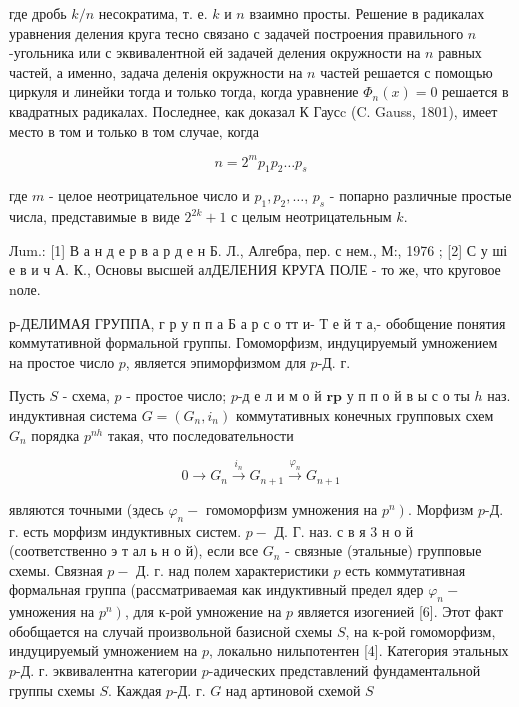 \documentclass[10pt]{article}
\begin{document}
где дробь $k / n$ несократима, т. е. $k$ и $n$ взаимно просты. Решение в радикалах уравнения деления круга тесно связано с задачей построения правильного $n$-угольника или с эквивалентной ей задачей деления окружности на $n$ равных частей, а именно, задача деленія окружности на $n$ частей решается с помощью циркуля и линейки тогда и только тогда, когда уравнение $\Phi_{n}(x)=0$ решается в квадратных радикалах. Последнее, как доказал К Гаусc (C. Gauss, 1801), имеет место в том и только в том случае, когда



\[

n=2^{m} p_{1} p_{2} \ldots p_{s}

\]



где $m$ - целое неотрицательное число и $p_{1}, p_{2}, \ldots$, $p_{s}$ - попарно различные простые числа, представимые в виде $2^{2 k}+1$ с целым неотрицательным $k$.



Лum.: [1] В а н д е р в а р д е н Б. Л., Алгебра, пер. с нем., М:, 1976 ; [2] С у ші е в и ч А. К., Основы высшей алДЕЛЕНИЯ КРУГА ПОЛЕ - то же, что круговое nоле.



р-ДЕЛИМАЯ ГРУППА, г р у п п а Б а р с о тт и- Т е й т а,- обобщение понятия коммутативной формальной группы. Гомоморфизм, индуцируемый умножением на простое число $p$, является эпиморфизмом для $p$-Д. г.



Пусть $S$ - схема, $p$ - простое число; $p$-д е л и м о й $\mathbf{r} \mathbf{p}$ у п п о й в ы с о ты $h$ наз. индуктивная система $G=\left(G_{n}, i_{n}\right)$ коммутативных конечных групповых схем $G_{n}$ порядка $p^{n h}$ такая, что последовательности



\[

0 \longrightarrow G_{n} \stackrel{i_{n}}{\longrightarrow} G_{n+1} \stackrel{\varphi_{n}}{\longrightarrow} G_{n+1}

\]



являются точными (здесь $\varphi_{n}-$ гомоморфизм умножения на $\left.p^{n}\right)$. Морфизм $p$-Д. г. есть морфизм индуктивных систем. $p-$ Д. Г. наз. с в я 3 н о й (соответственно э т ал ь н о й), если все $G_{n}$ - связные (этальные) групповые схемы. Связная $p-$ Д. г. над полем характеристики $p$ есть коммутативная формальная группа (рассматриваемая как индуктивный предел ядер $\varphi_{n}-$ умножения на $\left.p^{n}\right)$, для к-рой умножение на $p$ является изогенией [6]. Этот факт обобщается на случай произвольной базисной схемы $S$, на к-рой гомоморфизм, индуцируемый умножением на $p$, локально нильпотентен [4]. Категория этальных $p$-Д. г. эквивалентна категории $p$-адических представлений фундаментальной группы схемы $S$. Каждая $p$-Д. г. $G$ над артиновой схемой $S$
\end{document}
